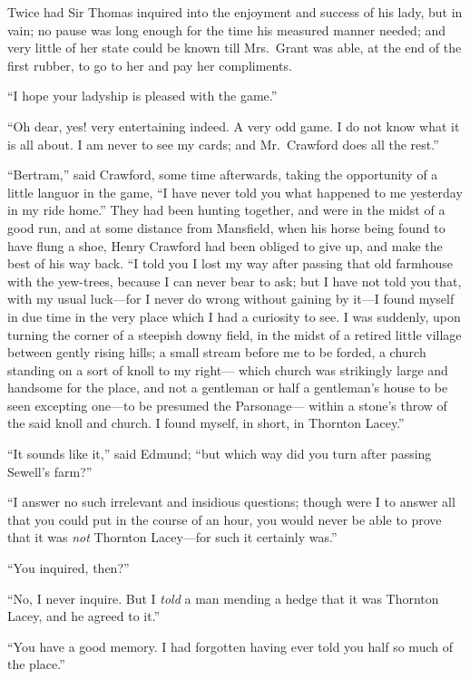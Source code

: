 \documentclass{article}
\begin{document}
Twice had Sir Thomas inquired into the enjoyment and
success of his lady, but in vain; no pause was long enough
for the time his measured manner needed; and very little
of her state could be known till Mrs.\ Grant was able,
at the end of the first rubber, to go to her and pay
her compliments.

``I hope your ladyship is pleased with the game.''

``Oh dear, yes! very entertaining indeed.  A very odd game.
I do not know what it is all about.  I am never to see
my cards; and Mr.\ Crawford does all the rest.''

``Bertram,'' said Crawford, some time afterwards, taking the
opportunity of a little languor in the game, ``I have never
told you what happened to me yesterday in my ride home.''
They had been hunting together, and were in the midst of a
good run, and at some distance from Mansfield, when his horse
being found to have flung a shoe, Henry Crawford had been
obliged to give up, and make the best of his way back.
``I told you I lost my way after passing that old farmhouse
with the yew-trees, because I can never bear to ask;
but I have not told you that, with my usual luck---for I
never do wrong without gaining by it---I found myself in due
time in the very place which I had a curiosity to see.
I was suddenly, upon turning the corner of a steepish
downy field, in the midst of a retired little village
between gently rising hills; a small stream before me to
be forded, a church standing on a sort of knoll to my right---%
which church was strikingly large and handsome for
the place, and not a gentleman or half a gentleman's house
to be seen excepting one---to be presumed the Parsonage---%
within a stone's throw of the said knoll and church.
I found myself, in short, in Thornton Lacey.''

``It sounds like it,'' said Edmund; ``but which way did you
turn after passing Sewell's farm?''

``I answer no such irrelevant and insidious questions;
though were I to answer all that you could put in the course
of an hour, you would never be able to prove that it
was \emph{not} Thornton Lacey---for such it certainly was.''

``You inquired, then?''

``No, I never inquire.  But I \emph{told} a man mending a hedge
that it was Thornton Lacey, and he agreed to it.''

``You have a good memory.  I had forgotten having ever
told you half so much of the place.''
\end{document}

